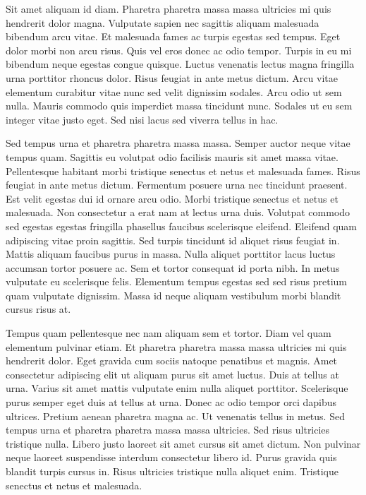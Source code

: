 \documentclass[11pt,a4paper]{article}
\begin{document}
Sit amet aliquam id diam. Pharetra pharetra massa massa ultricies mi quis hendrerit dolor magna. Vulputate sapien nec sagittis aliquam malesuada bibendum arcu vitae. Et malesuada fames ac turpis egestas sed tempus. Eget dolor morbi non arcu risus. Quis vel eros donec ac odio tempor. Turpis in eu mi bibendum neque egestas congue quisque. Luctus venenatis lectus magna fringilla urna porttitor rhoncus dolor. Risus feugiat in ante metus dictum. Arcu vitae elementum curabitur vitae nunc sed velit dignissim sodales. Arcu odio ut sem nulla. Mauris commodo quis imperdiet massa tincidunt nunc. Sodales ut eu sem integer vitae justo eget. Sed nisi lacus sed viverra tellus in hac.

Sed tempus urna et pharetra pharetra massa massa. Semper auctor neque vitae tempus quam. Sagittis eu volutpat odio facilisis mauris sit amet massa vitae. Pellentesque habitant morbi tristique senectus et netus et malesuada fames. Risus feugiat in ante metus dictum. Fermentum posuere urna nec tincidunt praesent. Est velit egestas dui id ornare arcu odio. Morbi tristique senectus et netus et malesuada. Non consectetur a erat nam at lectus urna duis. Volutpat commodo sed egestas egestas fringilla phasellus faucibus scelerisque eleifend. Eleifend quam adipiscing vitae proin sagittis. Sed turpis tincidunt id aliquet risus feugiat in. Mattis aliquam faucibus purus in massa. Nulla aliquet porttitor lacus luctus accumsan tortor posuere ac. Sem et tortor consequat id porta nibh. In metus vulputate eu scelerisque felis. Elementum tempus egestas sed sed risus pretium quam vulputate dignissim. Massa id neque aliquam vestibulum morbi blandit cursus risus at.

Tempus quam pellentesque nec nam aliquam sem et tortor. Diam vel quam elementum pulvinar etiam. Et pharetra pharetra massa massa ultricies mi quis hendrerit dolor. Eget gravida cum sociis natoque penatibus et magnis. Amet consectetur adipiscing elit ut aliquam purus sit amet luctus. Duis at tellus at urna. Varius sit amet mattis vulputate enim nulla aliquet porttitor. Scelerisque purus semper eget duis at tellus at urna. Donec ac odio tempor orci dapibus ultrices. Pretium aenean pharetra magna ac. Ut venenatis tellus in metus. Sed tempus urna et pharetra pharetra massa massa ultricies. Sed risus ultricies tristique nulla. Libero justo laoreet sit amet cursus sit amet dictum. Non pulvinar neque laoreet suspendisse interdum consectetur libero id. Purus gravida quis blandit turpis cursus in. Risus ultricies tristique nulla aliquet enim. Tristique senectus et netus et malesuada.
\end{document}
